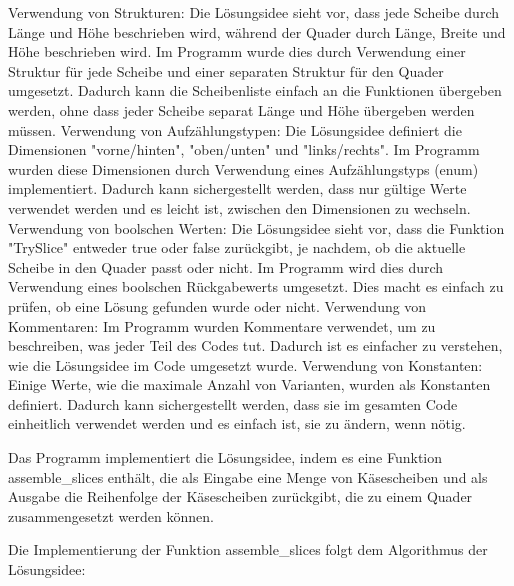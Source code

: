 \documentclass[a4paper,10pt,ngerman]{scrartcl}
\begin{document}
    Verwendung von Strukturen: Die Lösungsidee sieht vor, dass jede Scheibe durch Länge und Höhe beschrieben wird, während der Quader durch Länge, Breite und Höhe beschrieben wird.
    Im Programm wurde dies durch Verwendung einer Struktur für jede Scheibe und einer separaten Struktur für den Quader umgesetzt.
    Dadurch kann die Scheibenliste einfach an die Funktionen übergeben werden, ohne dass jeder Scheibe separat Länge und Höhe übergeben werden müssen.
    Verwendung von Aufzählungstypen: Die Lösungsidee definiert die Dimensionen "vorne/hinten", "oben/unten" und "links/rechts".
    Im Programm wurden diese Dimensionen durch Verwendung eines Aufzählungstyps (enum) implementiert.
    Dadurch kann sichergestellt werden, dass nur gültige Werte verwendet werden und es leicht ist, zwischen den Dimensionen zu wechseln.
    Verwendung von boolschen Werten: Die Lösungsidee sieht vor, dass die Funktion "TrySlice" entweder true oder false zurückgibt, je nachdem, ob die aktuelle Scheibe in den Quader passt oder nicht.
    Im Programm wird dies durch Verwendung eines boolschen Rückgabewerts umgesetzt.
    Dies macht es einfach zu prüfen, ob eine Lösung gefunden wurde oder nicht.
    Verwendung von Kommentaren: Im Programm wurden Kommentare verwendet, um zu beschreiben, was jeder Teil des Codes tut.
    Dadurch ist es einfacher zu verstehen, wie die Lösungsidee im Code umgesetzt wurde.
    Verwendung von Konstanten: Einige Werte, wie die maximale Anzahl von Varianten, wurden als Konstanten definiert.
    Dadurch kann sichergestellt werden, dass sie im gesamten Code einheitlich verwendet werden und es einfach ist, sie zu ändern, wenn nötig.

    Das Programm implementiert die Lösungsidee, indem es eine Funktion assemble\_slices enthält, die als Eingabe eine Menge von Käsescheiben und als Ausgabe die Reihenfolge der Käsescheiben zurückgibt, die zu einem Quader zusammengesetzt werden können.

    Die Implementierung der Funktion assemble\_slices folgt dem Algorithmus der Lösungsidee:
\end{document}
